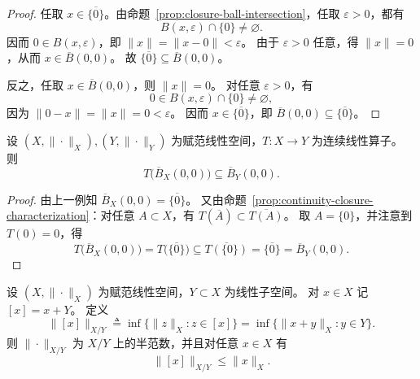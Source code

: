 \documentclass[lang=cn,a4paper,newtx,section]{elegantbook}
\begin{document}
\begin{proof}
  任取 $x\in\overline{\{0\}}$。由命题~\ref{prop:closure-ball-intersection}，任取 $\varepsilon>0$，都有
  \[
    B(x,\varepsilon)\cap\{0\}\ne\varnothing.
  \]
  因而 $0\in B(x,\varepsilon)$，即 $\|x\|=\|x-0\|<\varepsilon$。
  由于 $\varepsilon>0$ 任意，得 $\|x\|=0$，从而 $x\in\overline{B}(0,0)$。
  故 $\overline{\{0\}}\subseteq \overline{B}(0,0)$。

  反之，任取 $x\in\overline{B}(0,0)$，则 $\|x\|=0$。
  对任意 $\varepsilon>0$，有
  \[
    0\in B(x,\varepsilon)\cap\{0\}\ne\varnothing,
  \]
  因为 $\|0-x\|=\|x\|=0<\varepsilon$。
  因而 $x\in\overline{\{0\}}$，即 $\overline{B}(0,0)\subseteq \overline{\{0\}}$。
\end{proof}
\begin{corollary}
  设 $(X,\|\cdot\|_X),(Y,\|\cdot\|_Y)$ 为赋范线性空间，$T:X\to Y$ 为连续线性算子。
  则
  \[
    T\bigl(\overline{B}_X(0,0)\bigr)\subseteq \overline{B}_Y(0,0).
  \]
\end{corollary}

\begin{proof}
  由上一例知 $\overline{B}_X(0,0)=\overline{\{0\}}$。
  又由命题~\ref{prop:continuity-closure-characterization}：对任意 $A\subset X$，有 $T(\overline{A})\subset \overline{T(A)}$。
  取 $A=\{0\}$，并注意到 $T(0)=0$，得
  \[
    T\bigl(\overline{B}_X(0,0)\bigr)=T\bigl(\overline{\{0\}}\bigr)\subseteq \overline{T(\{0\})}
    =\overline{\{0\}}=\overline{B}_Y(0,0).
  \]
\end{proof}

\begin{proposition}
  设 $(X,\|\cdot\|_X)$ 为赋范线性空间，$Y\subset X$ 为线性子空间。
  对 $x\in X$ 记 $[x]=x+Y$。
  定义
  \[
    \|[x]\|_{X/Y}\triangleq \inf\{\|z\|_X: z\in[x]\}
    =\inf\{\|x+y\|_X: y\in Y\}.
  \]
  则 $\|\cdot\|_{X/Y}$ 为 $X/Y$ 上的半范数，并且对任意 $x\in X$ 有
  \[
    \|[x]\|_{X/Y}\le \|x\|_X.
  \]
\end{proposition}
\end{document}
